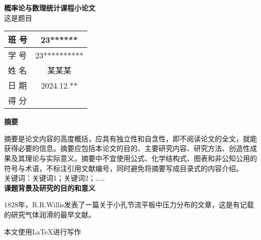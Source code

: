 \documentclass{article}
\begin{document}
{\centering{}
    \textbf{概率论与数理统计课程小论文} \\
    \vspace*{1em}
    {\heiti 这是题目} \\
}
\vspace*{8em}
\begin{center}
    {\bfseries{}
        \begin{tabular}{|>{\centering\arraybackslash}m{3cm}|c|}
            \hline
            班 \quad 号  & 23******   \\
            \hline
            学 \quad 号 & 23********** \\
            \hline
            姓 \quad 名 & 某某某        \\
            \hline
            日 \quad 期 & 2024.12.** \\
            \hline
            得 \quad 分 &            \\
            \hline
        \end{tabular}
    }
\end{center}
\newpage
{\centering
    \bfseries{}\heiti 摘\quad 要\par
}

摘要是论文内容的高度概括，应具有独立性和自含性，即不阅读论文的全文，就能获得必要的信息。摘要应包括本论文的目的、主要研究内容、研究方法、创造性成果及其理论与实际意义。摘要中不宜使用公式、化学结构式、图表和非公知公用的符号与术语，不标注引用文献编号，同时避免将摘要写成目录式的内容介绍。\\ 

关键词：关键词1；关键词2；…… \\

{
\noindent\textbf{课题背景及研究的目的和意义} \\
}

1828年，R.R.Willis发表了一篇关于小孔节流平板中压力分布的文章，这是有记载的研究气体润滑的最早文献。

\newpage
\printbibliography
\vfill
\begin{center}
    本文使用\LaTeX 进行写作
\end{center}
\end{document}
